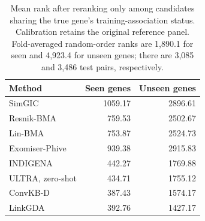 \begin{table}[tb]
\centering\small
\caption{Mean rank after reranking only among candidates sharing the true gene's training-association status. Calibration retains the original reference panel. Fold-averaged random-order ranks are 1,890.1 for seen and 4,923.4 for unseen genes; there are 3,085 and 3,486 test pairs, respectively.}
\label{tab:status}
\begin{tabular}{lrr}
\toprule
Method & Seen genes & Unseen genes \\
\midrule
SimGIC & 1059.17 & 2896.61 \\
Resnik-BMA & 759.53 & 2502.67 \\
Lin-BMA & 753.87 & 2524.73 \\
Exomiser-Phive & 939.38 & 2915.83 \\
INDIGENA & 442.27 & 1769.88 \\
ULTRA, zero-shot & 434.71 & 1755.12 \\
ConvKB-D & 387.43 & 1574.17 \\
LinkGDA & 392.76 & 1427.17 \\
\bottomrule
\end{tabular}
\end{table}
